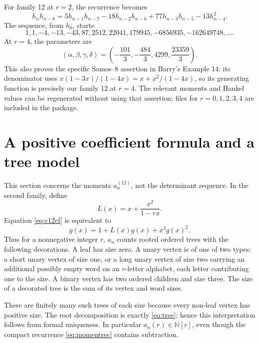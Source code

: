 \documentclass[11pt,letterpaper]{article}
\numberwithin{equation}{section}
\theoremstyle{definition}
\begin{document}
For family 12 at \(r=2\), the recurrence becomes
\begin{equation}
 h_nh_{n-8}=5h_{n-1}h_{n-7}-18h_{n-2}h_{n-6}
             +77h_{n-3}h_{n-5}-13h_{n-4}^2.
 \label{eq:r2rec}
\end{equation}
The sequence, from \(h_0\), starts
\begin{equation}
 1,1,-4,-13,-43,87,2512,22041,179945,-6856935,
 -162649748,\ldots.
\end{equation}
At \(r=4\), the parameters are
\begin{equation}
 (\alpha,\beta,\gamma,\delta)
 =\left(-\frac{101}{3},-\frac{484}{3},4299,\frac{23359}{3}\right).
\end{equation}
This also proves the specific Somos--8 assertion in Barry's Example 14:
its denominator uses
\(x(1-3x)/(1-4x)=x+x^2/(1-4x)\), so its generating function is precisely
our family 12 at \(r=4\). The relevant moments and Hankel values can be
regenerated without using that assertion; files for \(r=0,1,2,3,4\) are
included in the package.

\section{A positive coefficient formula and a tree model}
\label{sec:combinatorics}

This section concerns the moments \(a_n^{(12)}\), not the determinant
sequence. In the second family, define
\begin{equation}
 L(x)=x+\frac{x^2}{1-rx}.
 \label{eq:L}
\end{equation}
Equation \eqref{eq:c12cf} is equivalent to
\begin{equation}
 g(x)=1+L(x)g(x)+x^3g(x)^2.
 \label{eq:tree}
\end{equation}
Thus for a nonnegative integer \(r\), \(a_n\) counts rooted ordered trees
with the following decorations. A leaf has size zero. A unary vertex is
of one of two types: a short unary vertex of size one, or a long unary
vertex of size two carrying an additional possibly empty word on an
\(r\)-letter alphabet, each letter contributing one to the size. A binary
vertex has two ordered children and size three. The size of a decorated
tree is the sum of its vertex and word sizes.

There are finitely many such trees of each size because every non-leaf
vertex has positive size. The root decomposition is exactly
\eqref{eq:tree}; hence this interpretation follows from formal uniqueness.
In particular \(a_n(r)\in\mathbb N[r]\), even though the compact recurrence
\eqref{eq:momentrec} contains subtraction.
\end{document}
